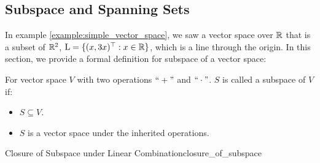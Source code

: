 \begin{example}
\end{example} 

\subsection{Subspace and Spanning Sets}
In example \ref{example:simple_vector_space}, we saw a vector space over $\mathbb{R}$ that is a subset of $\mathbb{R}^2$, $\mathrm{L}=\{(x, 3x)^\top : x\in\mathbb{R}\}$, which is a line through the origin. In this section, we provide a formal definition for subspace of a vector space:
\begin{definition}[Subspace]
	For vector space $V$ with two operations $``+"$ and $``\cdot"$. $S$ is called a subspace of $V$ if:
	\begin{itemize}
		\item $S\subseteq V$.
		\item $S$ is a vector space under the inherited operations.	
	\end{itemize} 	
\end{definition} 

\begin{proposition}{Closure of Subspace under Linear Combination}{closure_of_subspace}
	
\end{proposition} 


